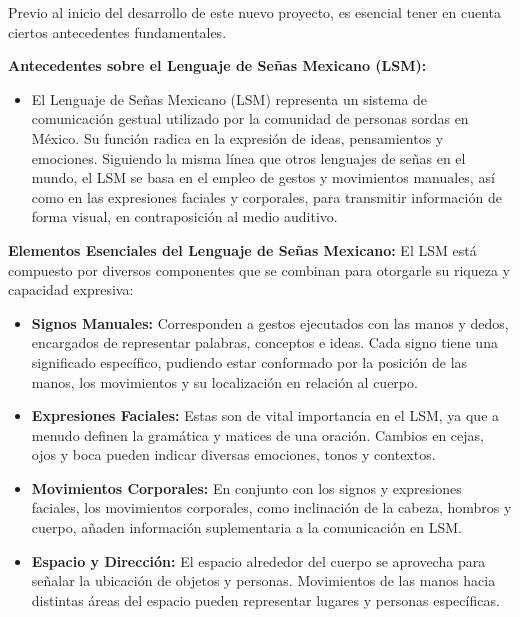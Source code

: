 \documentclass[conference]{IEEEtran}
\begin{document}
Previo al inicio del desarrollo de este nuevo proyecto, es esencial tener en cuenta ciertos antecedentes fundamentales.

\textbf{Antecedentes sobre el Lenguaje de Señas Mexicano (LSM):}
\begin{itemize}
    \item El Lenguaje de Señas Mexicano (LSM) representa un sistema de comunicación gestual utilizado por la comunidad de personas sordas en México. Su función radica en la expresión de ideas, pensamientos y emociones. Siguiendo la misma línea que otros lenguajes de señas en el mundo, el LSM se basa en el empleo de gestos y movimientos manuales, así como en las expresiones faciales y corporales, para transmitir información de forma visual, en contraposición al medio auditivo.
\end{itemize}


\textbf{Elementos Esenciales del Lenguaje de Señas Mexicano:}
El LSM está compuesto por diversos componentes que se combinan para otorgarle su riqueza y capacidad expresiva:
\begin{itemize}
    \item \textbf{Signos Manuales: }Corresponden a gestos ejecutados con las manos y dedos, encargados de representar palabras, conceptos e ideas. Cada signo tiene una significado específico, pudiendo estar conformado por la posición de las manos, los movimientos y su localización en relación al cuerpo.

    \item \textbf{Expresiones Faciales:} Estas son de vital importancia en el LSM, ya que a menudo definen la gramática y matices de una oración. Cambios en cejas, ojos y boca pueden indicar diversas emociones, tonos y contextos.

    \item \textbf{Movimientos Corporales:} En conjunto con los signos y expresiones faciales, los movimientos corporales, como inclinación de la cabeza, hombros y cuerpo, añaden información suplementaria a la comunicación en LSM.

    \item \textbf{Espacio y Dirección: }El espacio alrededor del cuerpo se aprovecha para señalar la ubicación de objetos y personas. Movimientos de las manos hacia distintas áreas del espacio pueden representar lugares y personas específicas.
    
\end{itemize}
\end{document}
